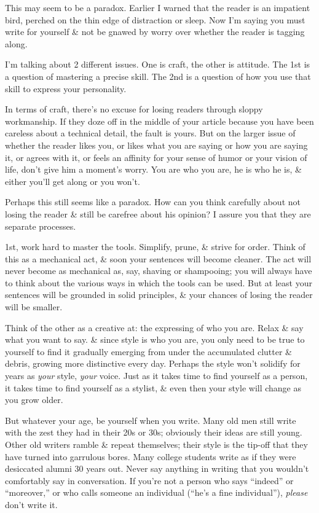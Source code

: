 \documentclass{article}
\begin{document}
This may seem to be a paradox. Earlier I warned that the reader is an impatient bird, perched on the thin edge of distraction or sleep. Now I'm saying you must write for yourself \& not be gnawed by worry over whether the reader is tagging along.

I'm talking about 2 different issues. One is craft, the other is attitude. The 1st is a question of mastering a precise skill. The 2nd is a question of how you use that skill to express your personality.

In terms of craft, there's no excuse for losing readers through sloppy workmanship. If they doze off in the middle of your article because you have been careless about a technical detail, the fault is yours. But on the larger issue of whether the reader likes you, or likes what you are saying or how you are saying it, or agrees with it, or feels an affinity for your sense of humor or your vision of life, don't give him a moment's worry. You are who you are, he is who he is, \& either you'll get along or you won't.

Perhaps this still seems like a paradox. How can you think carefully about not losing the reader \& still be carefree about his opinion? I assure you that they are separate processes.

1st, work hard to master the tools. Simplify, prune, \& strive for order. Think of this as a mechanical act, \& soon your sentences will become cleaner. The act will never become as mechanical as, say, shaving or shampooing; you will always have to think about the various ways in which the tools can be used. But at least your sentences will be grounded in solid principles, \& your chances of losing the reader will be smaller.

Think of the other as a creative at: the expressing of who you are. Relax \& say what you want to say. \& since style is who you are, you only need to be true to yourself to find it gradually emerging from under the accumulated clutter \& debris, growing more distinctive every day. Perhaps the style won't solidify for years as \textit{your} style, \textit{your} voice. Just as it takes time to find yourself as a person, it takes time to find yourself as a stylist, \& even then your style will change as you grow older.

But whatever your age, be yourself when you write. Many old men still write with the zest they had in their 20s or 30s; obviously their ideas are still young. Other old writers ramble \& repeat themselves; their style is the tip-off that they have turned into garrulous bores. Many college students write as if they were desiccated alumni 30 years out. Never say anything in writing that you wouldn't comfortably say in conversation. If you're not a person who says ``indeed'' or ``moreover,'' or who calls someone an individual (``he's a fine individual''), \textit{please} don't write it.
\end{document}
